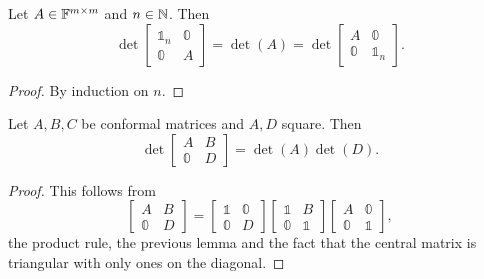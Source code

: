 \begin{lemma}
Let $A\in\mathbb{F}^{m\times m}$ and $n\in\mathbb{N}$. Then
\[ \det\begin{bmatrix}
\mathbb{1}_n & \mathbb{0} \\ \mathbb{0} & A
\end{bmatrix} = \det(A) = \det\begin{bmatrix}
A & \mathbb{0} \\ \mathbb{0} & \mathbb{1}_n
\end{bmatrix}. \]
\end{lemma}
\begin{proof}
By induction on $n$.
\end{proof}

\begin{lemma}
Let $A,B,C$ be conformal matrices and $A,D$ square. Then
\[ \det\begin{bmatrix}A & B \\ \mathbb{0} & D \end{bmatrix} = \det(A)\det(D). \]
\end{lemma}
\begin{proof}
This follows from
\[ \begin{bmatrix}A & B \\ \mathbb{0} & D \end{bmatrix} = \begin{bmatrix}\mathbb{1} & \mathbb{0} \\ \mathbb{0} & D \end{bmatrix} \begin{bmatrix}\mathbb{1} & B \\ \mathbb{0} & \mathbb{1} \end{bmatrix} \begin{bmatrix}A & \mathbb{0} \\ \mathbb{0} & \mathbb{1} \end{bmatrix}, \]
the product rule, the previous lemma and the fact that the central matrix is triangular with only ones on the diagonal.
\end{proof}

